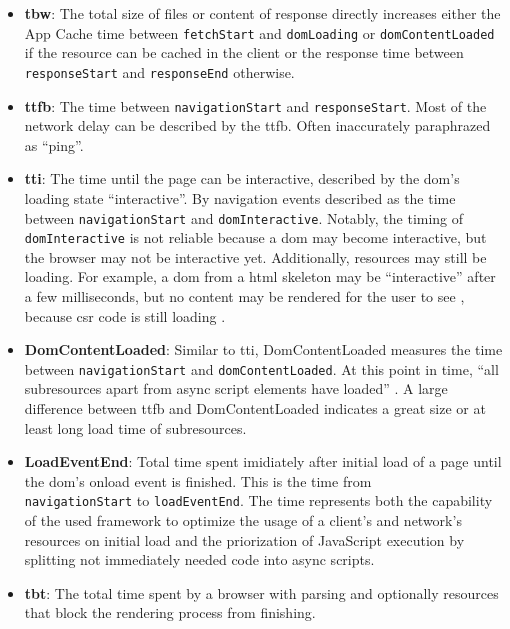 \documentclass[a4paper, 10pt]{article}
\begin{document}
\begin{itemize}
  \item \textbf{\acrfull{tbw}}: The total size of files or content of response directly increases either the App Cache time between \verb|fetchStart| and \verb|domLoading| or \verb|domContentLoaded| if the resource can be cached in the client or the response time between \verb|responseStart| and \verb|responseEnd| otherwise.
  \item \textbf{\acrfull{ttfb}}: The time between \verb|navigationStart| and \verb|responseStart|.
  Most of the network delay can be described by the \acrshort{ttfb}.
  Often inaccurately paraphrazed as \enquote{ping}.
  \item \textbf{\acrfull{tti}}: The time until the page can be interactive, described by the \acrshort{dom}'s loading state \enquote{interactive}.
  By navigation events described as the time between \verb|navigationStart| and \verb|domInteractive|.
  Notably, the timing of \verb|domInteractive| is not reliable because a \acrshort{dom} may become interactive, but the browser may not be interactive yet.
  Additionally, resources may still be loading.
  For example, a \acrshort{dom} from a \acrshort{html} skeleton may be \enquote{interactive} after a few milliseconds, but no content may be rendered for the user to see \citep{htmlLivingStandard}, because \acrshort{csr} code is still loading \citep{htmlLivingStandard}.
  \item \textbf{DomContentLoaded}: Similar to \acrshort{tti}, DomContentLoaded measures the time between \verb|navigationStart| and \verb|domContentLoaded|.
  At this point in time, \enquote{all subresources apart from async script elements have loaded} \citep{htmlLivingStandard}.
  A large difference between \acrshort{ttfb} and DomContentLoaded indicates a great size or at least long load time of subresources.
  \item \textbf{LoadEventEnd}: Total time spent imidiately after initial load of a page until the \acrshort{dom}'s onload event is finished.
  This is the time from \\
  \verb|navigationStart| to \verb|loadEventEnd|.
  The time represents both the capability of the used framework to optimize the usage of a client's and network's resources on initial load and the priorization of JavaScript execution by splitting not immediately needed code into async scripts.
  \item \textbf{\acrfull{tbt}}: The total time spent by a browser with parsing and optionally resources that block the rendering process from finishing.

\end{itemize}
\end{document}
